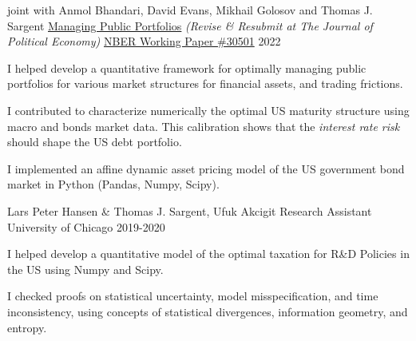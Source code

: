 

\begin{cventries}
	\cventry
	{joint with Anmol Bhandari, David Evans, Mikhail Golosov and Thomas J. Sargent} %
	{\href{https://static1.squarespace.com/static/54c19f18e4b0ef5f4b9f8dae/t/6328ee5213a65c43a48423f8/1663626851912/abegs4draft.pdf}{Managing Public Portfolios} \textit{(Revise \& Resubmit at The Journal of Political Economy)}}  %
	{\href{https://www.nber.org/papers/w30501}{NBER Working Paper \#30501}} %
	{2022} %
	{\begin{cvitems}
			\item I helped develop a quantitative framework for optimally managing public portfolios for various market structures for financial assets, and trading frictions.
			\item I contributed to characterize numerically the optimal US maturity structure using macro and bonds market data. This calibration shows that the \textit{interest rate risk} should shape the US debt portfolio.
			\item I implemented an affine dynamic asset pricing model of the US government bond market in Python (Pandas, Numpy, Scipy).
		\end{cvitems}}

	\cventry
	{Lars Peter Hansen \& Thomas J. Sargent, Ufuk Akcigit}
	{Research Assistant}
	{University of Chicago}
	{2019-2020}
	{\begin{cvitems}
			\item I helped develop a quantitative model of the optimal taxation for R\&D Policies in the US using Numpy and Scipy.
			\item I checked proofs on statistical uncertainty, model misspecification, and time inconsistency, using concepts of statistical divergences, information geometry, and entropy.
		\end{cvitems}
	}
\end{cventries}
